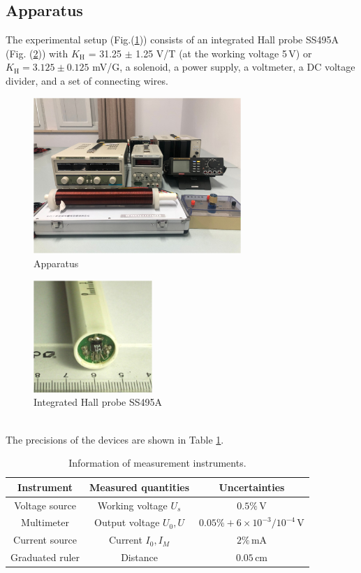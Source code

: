 \documentclass[a4paper]{article}
\begin{document}
\subsection{Apparatus}
The experimental setup (Fig.(\ref{fig::Apparatus})) consists of an integrated Hall probe SS495A (Fig. (\ref{fig::SS495A})) with $K_\text{H}$ = 31.25 $\pm$ 1.25 V/T (at the
working voltage 5$\,$V) or $K_\text{H} = 3.125\pm0.125$ mV/G, a solenoid, a power supply, a voltmeter, a DC voltage divider, and a set of connecting wires.
\begin{figure}[!htbp]
	\centering
	\includegraphics[width=0.7\textwidth]{Apparatus.png}
	\caption{Apparatus}
	\label{fig::Apparatus}
\end{figure}
\begin{figure}[!htbp]
	\centering
	\includegraphics[width=0.4\textwidth]{SS495A.png}
	\caption{Integrated Hall probe SS495A}
	\label{fig::SS495A}
\end{figure}\\
The precisions of the devices are shown in Table \ref{table::Precision}.
\begin{table}[htbp]
	\centering
	\begin{tabular}{ccc}
		\hline
		Instrument      & Measured quantities       & Uncertainties                         \\
		\hline
		Voltage source  & Working voltage $U_{s}$   & $0.5\%\,$V                            \\
		Multimeter      & Output voltage $U_{0}, U$ & $0.05\% + 6\times 10^{-3}/10^{-4}\,$V \\
		Current source  & Current $I_{0}, I_{M}$    & $2\%\,$mA                             \\
		Graduated ruler & Distance                  & $0.05\,$cm                            \\
		\hline
	\end{tabular}
	\caption{Information of measurement instruments.}
	\label{table::Precision}
\end{table}
\end{document}
